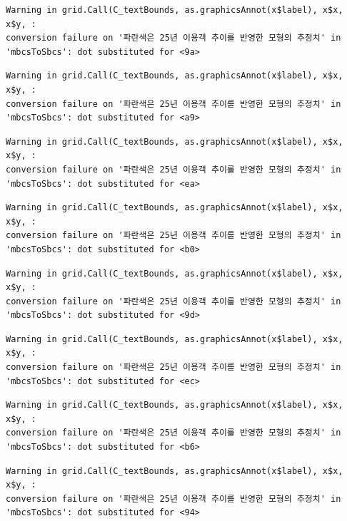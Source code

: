 \documentclass[
  letterpaper,
  DIV=11,
  numbers=noendperiod]{scrreprt}
\begin{document}
\begin{verbatim}
Warning in grid.Call(C_textBounds, as.graphicsAnnot(x$label), x$x, x$y, :
conversion failure on '파란색은 25년 이용객 추이를 반영한 모형의 추정치' in
'mbcsToSbcs': dot substituted for <9a>
\end{verbatim}

\begin{verbatim}
Warning in grid.Call(C_textBounds, as.graphicsAnnot(x$label), x$x, x$y, :
conversion failure on '파란색은 25년 이용객 추이를 반영한 모형의 추정치' in
'mbcsToSbcs': dot substituted for <a9>
\end{verbatim}

\begin{verbatim}
Warning in grid.Call(C_textBounds, as.graphicsAnnot(x$label), x$x, x$y, :
conversion failure on '파란색은 25년 이용객 추이를 반영한 모형의 추정치' in
'mbcsToSbcs': dot substituted for <ea>
\end{verbatim}

\begin{verbatim}
Warning in grid.Call(C_textBounds, as.graphicsAnnot(x$label), x$x, x$y, :
conversion failure on '파란색은 25년 이용객 추이를 반영한 모형의 추정치' in
'mbcsToSbcs': dot substituted for <b0>
\end{verbatim}

\begin{verbatim}
Warning in grid.Call(C_textBounds, as.graphicsAnnot(x$label), x$x, x$y, :
conversion failure on '파란색은 25년 이용객 추이를 반영한 모형의 추정치' in
'mbcsToSbcs': dot substituted for <9d>
\end{verbatim}

\begin{verbatim}
Warning in grid.Call(C_textBounds, as.graphicsAnnot(x$label), x$x, x$y, :
conversion failure on '파란색은 25년 이용객 추이를 반영한 모형의 추정치' in
'mbcsToSbcs': dot substituted for <ec>
\end{verbatim}

\begin{verbatim}
Warning in grid.Call(C_textBounds, as.graphicsAnnot(x$label), x$x, x$y, :
conversion failure on '파란색은 25년 이용객 추이를 반영한 모형의 추정치' in
'mbcsToSbcs': dot substituted for <b6>
\end{verbatim}

\begin{verbatim}
Warning in grid.Call(C_textBounds, as.graphicsAnnot(x$label), x$x, x$y, :
conversion failure on '파란색은 25년 이용객 추이를 반영한 모형의 추정치' in
'mbcsToSbcs': dot substituted for <94>
\end{verbatim}
\end{document}
